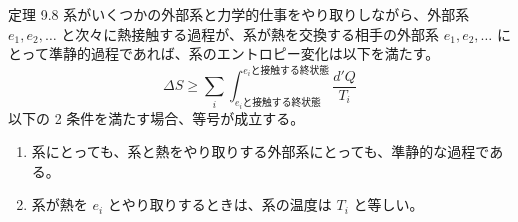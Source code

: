 \documentclass[aspectratio=149]{beamer}
\begin{document}
\begin{frame}
	\frametitle{}
	\begin{block}{定理 9.8}
		系がいくつかの外部系と力学的仕事をやり取りしながら、外部系 \(e_1, e_2,\dotsc\)
		と次々に熱接触する過程が、系が熱を交換する相手の外部系 \(e_1, e_2,\dotsc\) に
		とって準静的過程であれば、系のエントロピー変化は以下を満たす。
		\[\Delta S\geq\sum_i
			\int^{\text{\(e_i\)と接触する終状態}}_{\text{\(e_i\)と接触する終状態}}
			\frac{d'Q}{T_i}\tag{9.18}\]
		以下の 2 条件を満たす場合、等号が成立する。
		\begin{enumerate}
			\item 系にとっても、系と熱をやり取りする外部系にとっても、準静的な過程である。
			\item 系が熱を \(e_i\) とやり取りするときは、系の温度は \(T_i\) と等しい。
		\end{enumerate}
	\end{block}
\end{frame}
\end{document}
